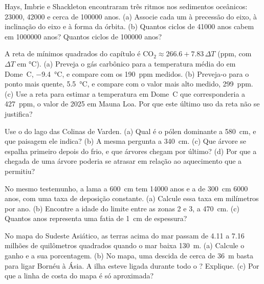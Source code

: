 \begin{exercise}[$\star$]\label{exo:g12:past-climates:5}
Hays, Imbrie e Shackleton encontraram três ritmos nos sedimentos oceânicos:
\num{23000}, \num{42000} e cerca de \num{100000} anos. (a) Associe cada um à
precessão do eixo, à inclinação do eixo e à forma da órbita.
(b) Quantos ciclos de \num{41000} anos cabem em \num{1000000} anos? Quantos
ciclos de \num{100000} anos?
\end{exercise}

\begin{exercise}[$\star\star$]\label{exo:g12:past-climates:6}
A reta de mínimos quadrados do capítulo é $\mathrm{CO_2} \approx 266.6 +
7.83\,\Delta T$ (ppm, com $\Delta T$ em \unit{\degreeCelsius}).
(a) Preveja o gás carbônico para a temperatura média do  em Dome~C, \qty{-9.4}{\degreeCelsius}, e compare com os
\qty{190}{ppm} medidos. (b) Preveja-o para o ponto mais quente,
\qty{+5.5}{\degreeCelsius}, e compare com o valor mais alto medido,
\qty{299}{ppm}. (c) Use a reta para estimar a temperatura em Dome~C que
corresponderia a \qty{427}{ppm}, o valor de 2025 em Mauna Loa. Por que este
último uso da reta não se justifica?
\end{exercise}

\begin{exercise}[$\star\star$]\label{exo:g12:past-climates:7}
Use o  do lago das Colinas de Varden. (a) Qual é o pólen
dominante a \qty{580}{cm}, e que paisagem ele indica? (b) A mesma pergunta a
\qty{340}{cm}. (c) Que árvore se espalha primeiro depois do frio, e que
árvores chegam por último? (d) Por que a chegada de uma árvore poderia se
atrasar em relação ao aquecimento que a permitiu?
\end{exercise}

\begin{exercise}[$\star\star$]\label{exo:g12:past-climates:8}
No mesmo testemunho, a lama a \qty{600}{cm} tem \num{14000} anos e a de
\qty{300}{cm} \num{6000} anos, com uma taxa de deposição constante.
(a) Calcule essa taxa em milímetros por ano. (b) Encontre a idade do limite
entre as zonas 2 e 3, a \qty{470}{cm}. (c) Quantos anos representa uma
fatia de \qty{1}{cm} de espessura?
\end{exercise}

\begin{exercise}[$\star\star$]\label{exo:g12:past-climates:9}
No mapa do Sudeste Asiático, as terras acima do mar passam de 4.11 a
7.16 milhões de quilômetros quadrados quando o mar baixa \qty{130}{m}.
(a) Calcule o ganho e a sua porcentagem. (b) No mapa, uma descida de cerca
de \qty{36}{m} basta para ligar Bornéu à Ásia. A ilha esteve ligada durante
todo o ? Explique. (c) Por que a linha de costa do mapa
é só aproximada?
\end{exercise}

